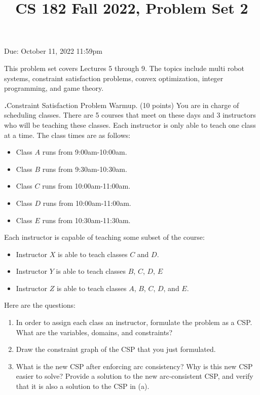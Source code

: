 \documentclass[12pt]{amsart}
\title{CS 182 Fall 2022, Problem Set 2}
\newenvironment{statement}[1]{\smallskip\noindent\color[rgb]{0.0,0.0,0.0} {\bf #1.}}{}
\theoremstyle{definition}
\theoremstyle{remark}
\newcommand{\1}{\mathds{1}}
\begin{document}
\maketitle

\vspace*{-0.25in}
\centerline{Due: October 11, 2022 11:59pm}


\begin{center}
\end{center}
\vspace*{0.15in}


\noindent This problem set covers Lectures 5 through 9. The topics include multi robot systems, constraint satisfaction problems, convex optimization, integer programming, and game theory.
\vspace*{0.35in}

\begin{statement}{1} \emph{Constraint Satisfaction Problem Warmup.} (10 points)
You are in charge of scheduling classes.
    There are 5 courses that meet on these days and 3 instructors who will be teaching these classes.
    Each instructor is only able to teach one class at a time.
    The class times are as follows:
    \begin{itemize}
        \item Class $A$ runs from 9:00am-10:00am.
        \item Class $B$ runs from 9:30am-10:30am.
        \item Class $C$ runs from 10:00am-11:00am.
        \item Class $D$ runs from 10:00am-11:00am.
        \item Class $E$ runs from 10:30am-11:30am.
    \end{itemize}
    Each instructor is capable of teaching some subset of the course:
    \begin{itemize}
        \item Instructor $X$ is able to teach classes $C$ and $D$.
        \item Instructor $Y$ is able to teach classes $B$, $C$, $D$, $E$
        \item Instructor $Z$ is able to teach classes $A$, $B$, $C$,  $D$, and $E$.
    \end{itemize}
    
    \vspace{3mm}
    
\noindent Here are the questions:

\begin{enumerate}
    \item In order to assign each class an instructor, formulate the problem as a CSP. What are the variables, domains, and constraints?
    \item Draw the constraint graph of the CSP that you just formulated.
    \item What is the new CSP after enforcing arc consistency? Why is this new CSP easier to solve? Provide a solution to the new arc-consistent CSP, and verify that it is also a solution to the CSP in (a).
\end{enumerate}
\end{statement}
\end{document}

